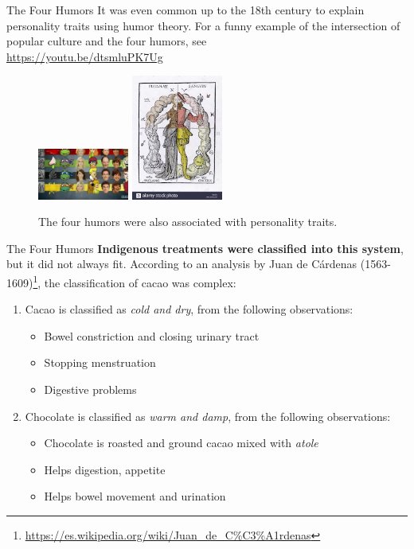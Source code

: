 \documentclass{beamer}
\begin{document}
\begin{frame}{The Four Humors}
\small
It was even common up to the 18th century to explain personality traits using humor theory.  For a funny example of the intersection of popular culture and the four humors, see \\ \vspace{0.25cm} \url{https://youtu.be/dtsmluPK7Ug}
\begin{figure}
\centering
\includegraphics[width=3cm]{figures/turtles.jpg}
\includegraphics[width=3cm]{figures/traits.png}
\caption{\label{fig:humors2} The four humors were also associated with personality traits.}
\end{figure}
\end{frame}

\begin{frame}{The Four Humors}
\small
\alert{\textbf{Indigenous treatments were classified into this system}, but it did not always fit}.  According to an analysis by Juan de C\'{a}rdenas (1563-1609)\footnote{\url{https://es.wikipedia.org/wiki/Juan_de_C\%C3\%A1rdenas}}, the classification of cacao was complex:
\begin{enumerate}
\item Cacao is classified as \textit{cold and dry}, from the following observations:
\begin{itemize}
\item Bowel constriction and closing urinary tract
\item Stopping menstruation
\item Digestive problems
\end{itemize}
\item Chocolate is classified as \textit{warm and damp}, from the following observations:
\begin{itemize}
\item Chocolate is roasted and ground cacao mixed with \textit{atole}
\item Helps digestion, appetite
\item Helps bowel movement and urination
\end{itemize}
\end{enumerate}
\end{frame}
\end{document}

